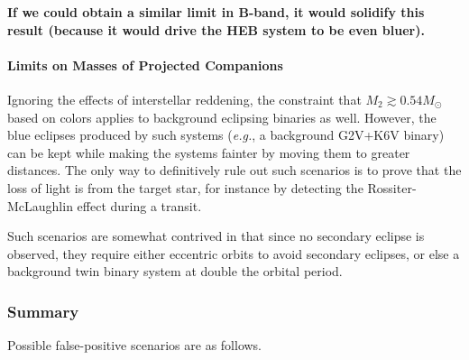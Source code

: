 \documentclass[12pt,twocolumn,tighten]{aastex62}
\begin{document}
{\bf If we could obtain a similar limit in B-band, it would 
	solidify this result (because it would drive the HEB system to be even bluer).}

\paragraph{Limits on Masses of Projected Companions}

Ignoring the effects of interstellar reddening,
the constraint that $M_2 \gtrsim 0.54 M_\odot$ based on
colors applies to background eclipsing binaries as well.
However, the blue eclipses produced by such systems ({\it e.g.}, a background G2V+K6V binary)
can be kept while making the systems fainter by moving them to greater
distances.
The only way to definitively rule out such scenarios is to 
prove that the loss of light is from the target star,
for instance by detecting the Rossiter-McLaughlin effect
during a transit.

Such scenarios are somewhat contrived in that since 
no secondary eclipse is observed, they require either
eccentric orbits to avoid secondary eclipses, or else a
background twin binary system at double
the orbital period.


\newpage
\subsubsection{Summary}

Possible false-positive scenarios are as follows.
\end{document}
